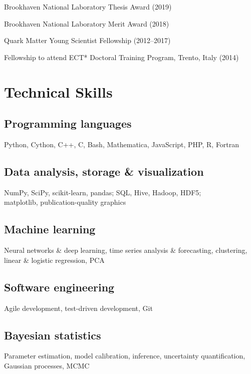 \documentclass[letterpaper,10pt]{article}
\begin{document}
\begin{multicols}{2}
Brookhaven National Laboratory Thesis Award (2019)

Brookhaven National Laboratory Merit Award (2018)

Quark Matter Young Scientist Fellowship (2012--2017)

Fellowship to attend ECT* Doctoral Training Program, Trento, Italy (2014)



\columnbreak


\section{Technical Skills}

\subsection{Programming languages}

Python, Cython, C++, C, Bash, Mathematica, JavaScript, PHP, R, Fortran

\subsection{Data analysis, storage \& visualization}

NumPy, SciPy, scikit-learn, pandas; SQL, Hive, Hadoop, HDF5; \\
matplotlib, publication-quality graphics

\subsection{Machine learning}

Neural networks \& deep learning, time series analysis \& forecasting, clustering, linear \& logistic regression, PCA

\subsection{Software engineering}

Agile development, test-driven development, Git

\subsection{Bayesian statistics}

Parameter estimation, model calibration, inference, uncertainty quantification, Gaussian processes, MCMC


\end{multicols}
\end{document}
